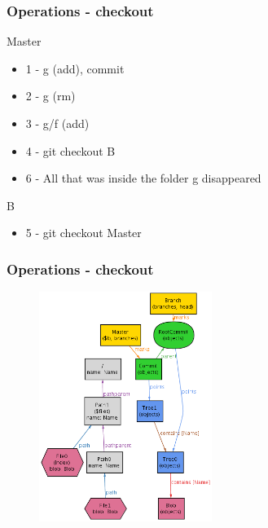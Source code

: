 \documentclass{beamer}
\begin{document}
\begin{frame}
	\frametitle{Operations - checkout}
	\begin{block}{Master}
	\begin{itemize}
		\item 1 - g (add), commit
		\item 2 - g (rm)
		\item 3 - g/f (add)
		\item 4 - git checkout B
		\item 6 - All that was inside the folder g disappeared
	\end{itemize}
	\end{block}

	\begin{block}{B}
	\begin{itemize}
		\item 5 - git checkout Master
	\end{itemize}
	\end{block}
\end{frame}

\begin{frame}[fragile]
   \frametitle{Operations - checkout}
      \begin{figure}
         \centering
         \includegraphics[width=0.50\textwidth]{images/checkout1.png}
      \end{figure}
\end{frame}
\end{document}
